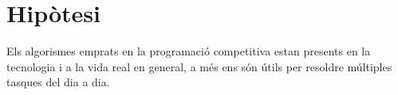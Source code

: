 \section{Hipòtesi}








Els algorismes emprats en la programació competitiva estan presents en la tecnologia i a la vida real en general, a més ens són útils per resoldre múltiples tasques del dia a dia.